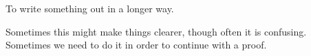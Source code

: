 To write something out in a longer way. 
\par
Sometimes this might make things clearer,
though often it is confusing. Sometimes we
need to do it in order to continue with a proof.
